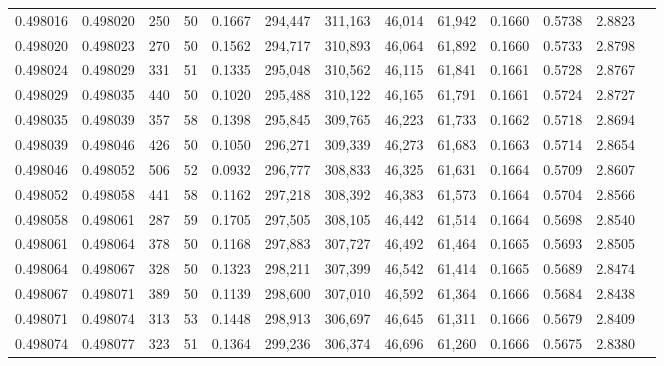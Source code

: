 \begin{tabular}{rrrrrrrrrrrrr}
0.498016 & 0.498020 & 250 &  50 &                                     0.1667 & 294,447 & 311,163 &  46,014 &  61,942 & 0.1660 & 0.5738 & 2.8823 \\
0.498020 & 0.498023 & 270 &  50 &                                     0.1562 & 294,717 & 310,893 &  46,064 &  61,892 & 0.1660 & 0.5733 & 2.8798 \\
0.498024 & 0.498029 & 331 &  51 &                                     0.1335 & 295,048 & 310,562 &  46,115 &  61,841 & 0.1661 & 0.5728 & 2.8767 \\
0.498029 & 0.498035 & 440 &  50 &                                     0.1020 & 295,488 & 310,122 &  46,165 &  61,791 & 0.1661 & 0.5724 & 2.8727 \\
0.498035 & 0.498039 & 357 &  58 &                                     0.1398 & 295,845 & 309,765 &  46,223 &  61,733 & 0.1662 & 0.5718 & 2.8694 \\
0.498039 & 0.498046 & 426 &  50 &                                     0.1050 & 296,271 & 309,339 &  46,273 &  61,683 & 0.1663 & 0.5714 & 2.8654 \\
0.498046 & 0.498052 & 506 &  52 &                                     0.0932 & 296,777 & 308,833 &  46,325 &  61,631 & 0.1664 & 0.5709 & 2.8607 \\
0.498052 & 0.498058 & 441 &  58 &                                     0.1162 & 297,218 & 308,392 &  46,383 &  61,573 & 0.1664 & 0.5704 & 2.8566 \\
0.498058 & 0.498061 & 287 &  59 &                                     0.1705 & 297,505 & 308,105 &  46,442 &  61,514 & 0.1664 & 0.5698 & 2.8540 \\
0.498061 & 0.498064 & 378 &  50 &                                     0.1168 & 297,883 & 307,727 &  46,492 &  61,464 & 0.1665 & 0.5693 & 2.8505 \\
0.498064 & 0.498067 & 328 &  50 &                                     0.1323 & 298,211 & 307,399 &  46,542 &  61,414 & 0.1665 & 0.5689 & 2.8474 \\
0.498067 & 0.498071 & 389 &  50 &                                     0.1139 & 298,600 & 307,010 &  46,592 &  61,364 & 0.1666 & 0.5684 & 2.8438 \\
0.498071 & 0.498074 & 313 &  53 &                                     0.1448 & 298,913 & 306,697 &  46,645 &  61,311 & 0.1666 & 0.5679 & 2.8409 \\
0.498074 & 0.498077 & 323 &  51 &                                     0.1364 & 299,236 & 306,374 &  46,696 &  61,260 & 0.1666 & 0.5675 & 2.8380 \\

\end{tabular}
